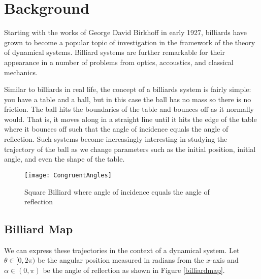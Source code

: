\chapter{Background}

Starting with the works of George David Birkhoff in early 1927, billiards have grown to become a popular topic of investigation in the framework of the theory of dynamical systems. Billiard systems are further remarkable for their appearance in a number of problems from optics, accoustics, and classical mechanics.

Similar to billiards in real life, the concept of a billiards system is fairly simple: you have a table and a ball, but in this case the ball has no mass so there is no friction. The ball hits the boundaries of the table and bounces off as it normally would. That is, it moves along in a straight line until it hits the edge of the table where it bounces off such that the angle of incidence equals the angle of reflection. Such systems become increasingly interesting in studying the trajectory of the ball as we change parameters such as the initial position, initial angle, and even the shape of the table. 

\begin{figure}[h]
    \centering
    \texttt{[image: CongruentAngles]}
    \caption{Square Billiard where angle of incidence equals the angle of reflection}
    \label{fig:my_label}
\end{figure}

\section{Billiard Map}
We can express these trajectories in the context of a dynamical system. Let $\theta \in [0,2\pi)$ be the angular position measured in radians from the $x$-axis and $\alpha \in (0, \pi)$ be the angle of reflection as shown in Figure \ref{billiardmap}.

